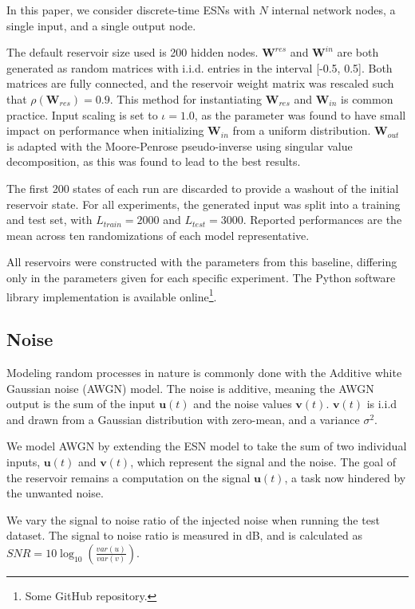 In this paper, we consider discrete-time ESNs with $N$ internal network nodes, a
single input, and a single output node.

The default reservoir size used is 200 hidden nodes. $\mathbf{W}^{res}$ and
$\mathbf{W}^{in}$ are both generated as random matrices with i.i.d. entries in
the interval [-0.5, 0.5]. Both matrices are fully connected, and the reservoir
weight matrix was rescaled such that $\rho(\mathbf{W}_{res}) = 0.9$. This method
for instantiating $\mathbf{W}_{res}$ and $\mathbf{W}_{in}$ is common
practice. Input scaling is set to $\iota = 1.0$, as the parameter was found to
have small impact on performance when initializing $\mathbf{W}_{in}$ from a
uniform distribution. $\mathbf{W}_{out}$ is adapted with the Moore-Penrose
pseudo-inverse using singular value decomposition, as this was found to lead to
the best results.

The first 200 states of each run are discarded to provide a washout of the
initial reservoir state. For all experiments, the generated input was split into
a training and test set, with $L_{train} = 2000$ and $L_{test} = 3000$. Reported
performances are the mean across ten randomizations of each model
representative.

All reservoirs were constructed with the parameters from this baseline,
differing only in the parameters given for each specific experiment. The Python
software library implementation is available online\footnote{Some GitHub
repository.}.

\subsection{Noise}

Modeling random processes in nature is commonly done with the Additive white
Gaussian noise (AWGN) model. The noise is additive, meaning the AWGN output is
the sum of the input $\mathbf{u}(t)$ and the noise values
$\mathbf{v}(t)$. $\mathbf{v}(t)$ is i.i.d and drawn from a Gaussian distribution
with zero-mean, and a variance $\sigma^{2}$.

We model AWGN by extending the ESN model to take the sum of two individual
inputs, $\mathbf{u}(t)$ and $\mathbf{v}(t)$, which represent the signal and the
noise. The goal of the reservoir remains a computation on the signal
$\mathbf{u}(t)$, a task now hindered by the unwanted noise.

We vary the signal to noise ratio of the injected noise when running the test
dataset. The signal to noise ratio is measured in dB, and is calculated as $SNR
= 10\log_{10}(\frac{var(u)}{var(v)})$.


